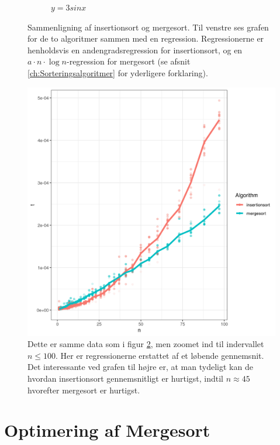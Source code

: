 \begin{figure}
\begin{subfigure}[b]{0.45\textwidth}
		\caption{$y=3sinx$}
		\label{fig:residualplot}
	\end{subfigure}
	\caption{Sammenligning af insertionsort og mergesort. Til venstre ses grafen for de to algoritmer sammen med en regression. Regressionerne er henholdsvis en andengradsregression for insertionsort, og en $a \cdot n \cdot \log n$-regression for mergesort (se afsnit \ref{ch:Sorteringsalgoritmer} for yderligere forklaring).}
	\label{fig:plot - to algoritmer}
\end{figure}

\begin{figure}
	\begin{center}
		\includegraphics[scale=0.6]{../img/toAlgoritmerZoomedGns.png}
	\end{center}
	\caption{Dette er samme data som i figur \ref{fig:plot - to algoritmer}, men zoomet ind til indervallet $n \leq 100$. Her er regressionerne erstattet af et løbende gennemsnit. Det interessante ved grafen til højre er, at man tydeligt kan de hvordan insertionsort gennemsnitligt er hurtigst, indtil $n \approx 45$ hvorefter mergesort er hurtigst.}
	\label{fig:toAlgoritmerZoomedGns}
\end{figure}

\section{Optimering af Mergesort}%
\label{sub:Optimering af Mergesort}

